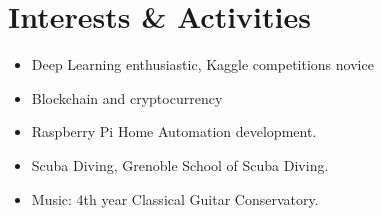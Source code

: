 \documentclass[letterpaper]{twentysecondcv} %
\begin{document}
\section{Interests \& Activities}
\begin{itemize}
\item Deep Learning enthusiastic, Kaggle competitions novice
\item Blockchain and cryptocurrency
\item Raspberry Pi Home Automation development.
\item Scuba Diving, Grenoble School of Scuba Diving.
\item Music: 4th year Classical Guitar Conservatory.

\end{itemize}
\end{document}
